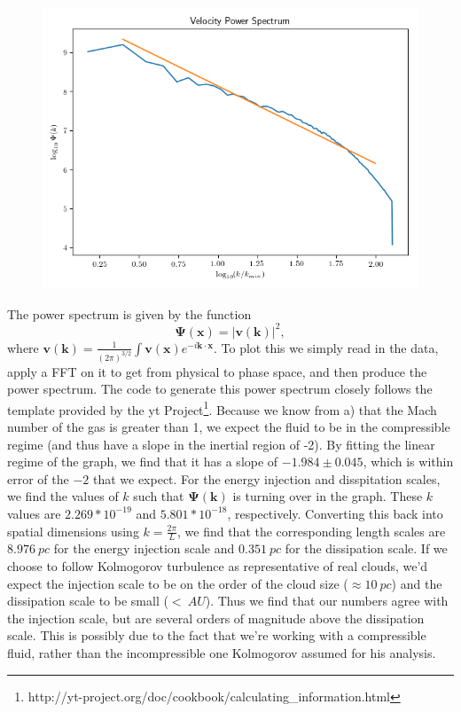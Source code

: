 \documentclass[11pt]{article}
\newenvironment{tight_enumerate}{
\begin{enumerate}[label=(\alph*)]
\setlength{\itemsep}{3pt}
\setlength{\parskip}{0pt}
}{\end{enumerate}}
\begin{document}
\begin{tight_enumerate}
\item \leavevmode
\begin{figure}[H]
\vspace{-1em}
\centering
\includegraphics[height=0.4\textheight]{2/ps.png}
\vspace{-1.5em}
\end{figure}
The power spectrum is given by the function 
\[\mathbf{\Psi(x)} = |\mathbf{v(k)}|^{2},\]
where $\mathbf{v(k)} = \frac{1}{(2\pi)^{3/2}}\int{\mathbf{v(x)}e^{-i\mathbf{k \cdot x}}}$. To plot this we simply read in the data, apply a FFT on it to get from physical to phase space, and then produce the power spectrum. The code to generate this power spectrum closely follows the template provided by the yt Project\footnote{http://yt-project.org/doc/cookbook/calculating\_information.html}. Because we know from a) that the Mach number of the gas is greater than 1, we expect the fluid to be in the compressible regime (and thus have a slope in the inertial region of -2). By fitting the linear regime of the graph, we find that it has a slope of $-1.984\pm0.045$, which is within error of the $-2$ that we expect. For the energy injection and disspitation scales, we find the values of $k$ such that $\mathbf{\Psi(k)}$ is turning over in the graph. These $k$ values are $2.269*10^{-19}$ and $5.801*10^{-18}$, respectively. Converting this back into spatial dimensions using $k = \frac{2\pi}{L}$, we find that the corresponding length scales are $8.976\ \si{pc}$ for the energy injection scale and $0.351\ \si{pc}$ for the dissipation scale. If we choose to follow Kolmogorov turbulence as representative of real clouds, we'd expect the injection scale to be on the order of the cloud size ($\approx 10\ \si{pc}$) and the dissipation scale to be small ($<\ \si{AU}$). Thus we find that our numbers agree with the injection scale, but are several orders of magnitude above the dissipation scale. This is possibly due to the fact that we're working with a compressible fluid, rather than the incompressible one Kolmogorov assumed for his analysis.
\item \frownie
\end{tight_enumerate}
\end{document}
